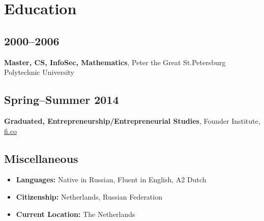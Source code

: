 \section*{Education}

\subsection*{2000--2006}
\textbf{Master, CS, InfoSec, Mathematics}, Peter the Great St.Petersburg Polytechnic University

\subsection*{Spring--Summer 2014}
\textbf{Graduated, Entrepreneurship/Entrepreneurial Studies}, Founder Institute, \href{https://fi.co}{\url{fi.co}}

\subsection*{Miscellaneous}
\begin{itemize}[noitemsep, nosep]
  \item \textbf{Languages:} Native in Russian, Fluent in English, A2 Dutch
  \item \textbf{Citizenship:} Netherlands, Russian Federation
  \item \textbf{Current Location:} The Netherlands
\end{itemize}
